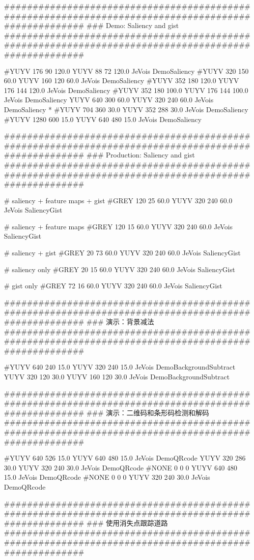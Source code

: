 \begin{DoxyVerb}
####################################################################################################
### Demo: Saliency and gist
####################################################################################################

#YUYV 176 90 120.0 YUYV 88 72 120.0 JeVois DemoSaliency
#YUYV 320 150 60.0 YUYV 160 120 60.0 JeVois DemoSaliency
#YUYV 352 180 120.0 YUYV 176 144 120.0 JeVois DemoSaliency
#YUYV 352 180 100.0 YUYV 176 144 100.0 JeVois DemoSaliency
YUYV 640 300 60.0 YUYV 320 240 60.0 JeVois DemoSaliency *
#YUYV 704 360 30.0 YUYV 352 288 30.0 JeVois DemoSaliency
#YUYV 1280 600 15.0 YUYV 640 480 15.0 JeVois DemoSaliency

####################################################################################################
### Production: Saliency and gist
####################################################################################################

# saliency + feature maps + gist
#GREY 120 25 60.0 YUYV 320 240 60.0 JeVois SaliencyGist

# saliency + feature maps
#GREY 120 15 60.0 YUYV 320 240 60.0 JeVois SaliencyGist

# saliency + gist
#GREY 20 73 60.0 YUYV 320 240 60.0 JeVois SaliencyGist

# saliency only
#GREY 20 15 60.0 YUYV 320 240 60.0 JeVois SaliencyGist

# gist only
#GREY 72 16 60.0 YUYV 320 240 60.0 JeVois SaliencyGist

#################################################################################################### 
### 演示：背景减法 
####################################################################################################

#YUYV 640 240 15.0 YUYV 320 240 15.0 JeVois DemoBackgroundSubtract
YUYV 320 120 30.0 YUYV 160 120 30.0 JeVois DemoBackgroundSubtract

#################################################################################################### 
### 演示：二维码和条形码检测和解码 
####################################################################################################

#YUYV 640 526 15.0 YUYV 640 480 15.0 JeVois DemoQRcode
YUYV 320 286 30.0 YUYV 320 240 30.0 JeVois DemoQRcode
#NONE 0 0 0 YUYV 640 480 15.0 JeVois DemoQRcode
#NONE 0 0 0 YUYV 320 240 30.0 JeVois DemoQRcode

#################################################################################################### 
### 使用消失点跟踪道路 
####################################################################################################


\end{DoxyVerb}
